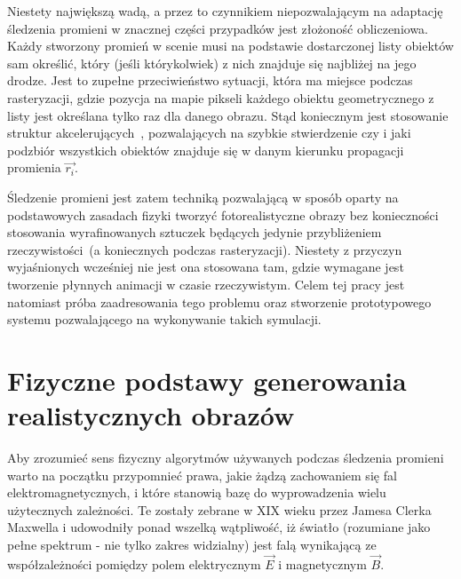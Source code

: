 Niestety największą wadą, a przez to czynnikiem niepozwalającym na adaptację śledzenia promieni w znacznej części przypadków jest złożoność obliczeniowa. Każdy stworzony promień w scenie musi na podstawie dostarczonej listy obiektów sam określić, który (jeśli którykolwiek) z nich znajduje się najbliżej na jego drodze. Jest to zupełne przeciwieństwo sytuacji, która ma miejsce podczas rasteryzacji, gdzie pozycja na mapie pikseli każdego obiektu geometrycznego z listy jest określana tylko raz dla danego obrazu. Stąd koniecznym jest stosowanie struktur akcelerujących~\cite{FASTTREE}\cite{FAST_KDTREES}, pozwalających na szybkie stwierdzenie czy i jaki podzbiór wszystkich obiektów znajduje się w danym kierunku propagacji promienia $\vec{r_i}$.
\newline

Śledzenie promieni jest zatem techniką pozwalającą w sposób oparty na podstawowych zasadach fizyki tworzyć fotorealistyczne obrazy bez konieczności stosowania wyrafinowanych sztuczek będących jedynie przybliżeniem rzeczywistości~(a koniecznych podczas rasteryzacji). Niestety z przyczyn wyjaśnionych wcześniej nie jest ona stosowana tam, gdzie wymagane jest tworzenie płynnych animacji w czasie rzeczywistym. Celem tej pracy jest natomiast próba zaadresowania tego problemu oraz stworzenie prototypowego systemu pozwalającego na wykonywanie takich symulacji. 
\section{Fizyczne podstawy generowania realistycznych obrazów}
Aby zrozumieć sens fizyczny algorytmów używanych podczas śledzenia promieni warto na początku przypomnieć prawa, jakie żądzą zachowaniem się fal elektromagnetycznych, i które stanowią bazę do wyprowadzenia wielu użytecznych zależności. Te zostały zebrane w XIX wieku przez Jamesa Clerka Maxwella i udowodniły ponad wszelką wątpliwość, iż światło (rozumiane jako pełne spektrum - nie tylko zakres widzialny) jest falą wynikającą ze współzależności pomiędzy polem elektrycznym $\vec{E}$ i magnetycznym $\vec{B}$. 

